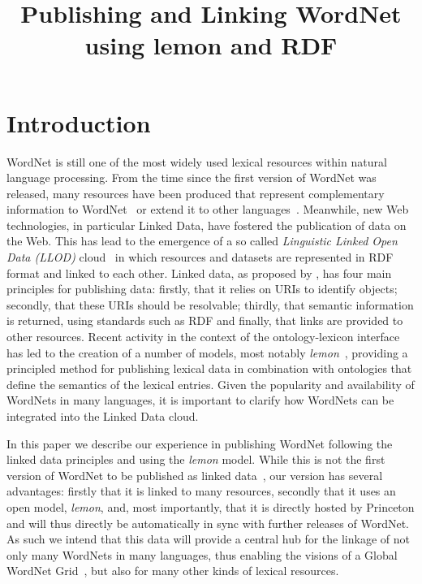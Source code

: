 \documentclass[10pt, a4paper]{article}
\title{Publishing and Linking WordNet using lemon and RDF}
\newcommand{\lemon}[0]{\emph{lemon}}
\begin{document}
\maketitleabstract

\section{Introduction}

WordNet is still one of the most widely used lexical resources within natural 
language processing. From the time since the first version of WordNet was released, many
resources have been produced that represent complementary information to WordNet~\cite{schuler2005verbnet,baker1998berkeley}
or extend it to other languages~\cite{vossen1998eurowordnet,bond2013linking}. 
Meanwhile, new Web technologies, in particular Linked Data, have fostered the publication of data on the Web.
This has lead to the emergence of a so called \emph{Linguistic Linked Open Data (LLOD)} cloud~\cite{chiarcos2011towards} in which resources and datasets are represented in RDF format and linked to each other.
Linked data, as proposed by \cite{berners2011linked}, has four
main principles for publishing data: firstly, that it relies on URIs to identify
objects; secondly, that these URIs should be resolvable; thirdly, that semantic
information is returned, using standards such as RDF and finally, that links are
provided to other resources. 
Recent activity in the context of the ontology-lexicon interface has
led to the creation of a number of models, most notably
\lemon{}~\cite{mccrae2012interchanging}, providing a principled method for publishing lexical data in combination with ontologies that define the semantics of the lexical entries.
Given the popularity and availability of WordNets in
many languages, it is important to clarify how WordNets can be integrated into the Linked Data cloud.

In this paper we describe our experience
in publishing WordNet following the linked data principles and using the \lemon{} model. While this is not
the first version of WordNet to be published as linked data~\cite{van2006conversion,mccrae2012integrating,graves2006data}, our 
version has several advantages: firstly that it is linked to many
resources, secondly that it uses an open model, \emph{lemon}, and, most importantly, that 
it is directly hosted by Princeton and will thus directly be automatically in sync with further releases of WordNet. 
As such we intend that this data will provide a central hub for the linkage of
not only many WordNets in many languages, thus enabling the visions of a Global
WordNet Grid~\cite{pease2008building}, but also for many other kinds of lexical resources. 
\end{document}
